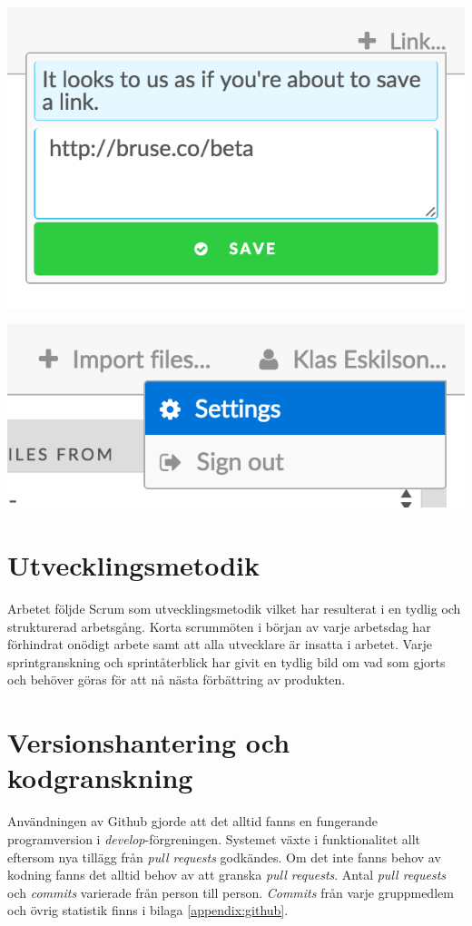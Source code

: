 \begin{Figure}
  \centering
    \includegraphics[width=0.4\linewidth]{figures/screenshots/dump4.png}
\end{Figure}

\begin{Figure}
  \centering
    \includegraphics[width=0.4\linewidth]{figures/screenshots/dump5.png}
\end{Figure}

\section{Utvecklingsmetodik}

Arbetet följde Scrum som utvecklingsmetodik vilket har resulterat i en tydlig
och strukturerad arbetsgång. Korta scrummöten i början av varje arbetsdag har
förhindrat onödigt arbete samt att alla utvecklare är insatta i arbetet. Varje
sprintgranskning och sprintåterblick har givit en tydlig bild om vad som gjorts
och behöver göras för att nå nästa förbättring av produkten.

\section{Versionshantering och kodgranskning}

Användningen av Github gjorde att det alltid fanns en fungerande programversion
i \emph{develop}-förgreningen. Systemet växte i funktionalitet allt eftersom
nya tillägg från \emph{pull requests} godkändes. Om det inte fanns behov av
kodning fanns det alltid behov av att granska \emph{pull requests}. Antal
\emph{pull requests} och \emph{commits} varierade från person till person.
\emph{Commits} från varje gruppmedlem och övrig statistik finns i bilaga \ref{appendix:github}.
